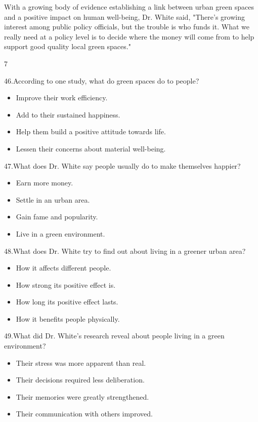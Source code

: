 \documentclass[UTF8,11pt]{ctexart}
\begin{document}
With a growing body of evidence establishing a link between urban green spaces and a positive impact on human well-being, Dr. White said, "There's growing interest among public policy officials, but the trouble is who funds it. What we really need at a policy level is to decide where the money will come from to help support good quality local green spaces."


7


46.According to one study, what do green spaces do to people?


\begin{itemize}[leftmargin=2em,itemsep=.2em,topsep=.4em]\item[A.] Improve their work efficiency.
\item[B.] Add to their sustained happiness.
\item[C.] Help them build a positive attitude towards life.
\item[D.] Lessen their concerns about material well-being.
\end{itemize}

47.What does Dr. White say people usually do to make themselves happier?


\begin{itemize}[leftmargin=2em,itemsep=.2em,topsep=.4em]\item[A.] Earn more money.
\item[B.] Settle in an urban area.
\item[C.] Gain fame and popularity.
\item[D.] Live in a green environment.
\end{itemize}

48.What does Dr. White try to find out about living in a greener urban area?


\begin{itemize}[leftmargin=2em,itemsep=.2em,topsep=.4em]\item[A.] How it affects different people.
\item[B.] How strong its positive effect is.
\item[C.] How long its positive effect lasts.
\item[D.] How it benefits people physically.
\end{itemize}

49.What did Dr. White's research reveal about people living in a green environment?


\begin{itemize}[leftmargin=2em,itemsep=.2em,topsep=.4em]\item[A.] Their stress was more apparent than real.
\item[B.] Their decisions required less deliberation.
\item[C.] Their memories were greatly strengthened.
\item[D.] Their communication with others improved.
\end{itemize}
\end{document}
